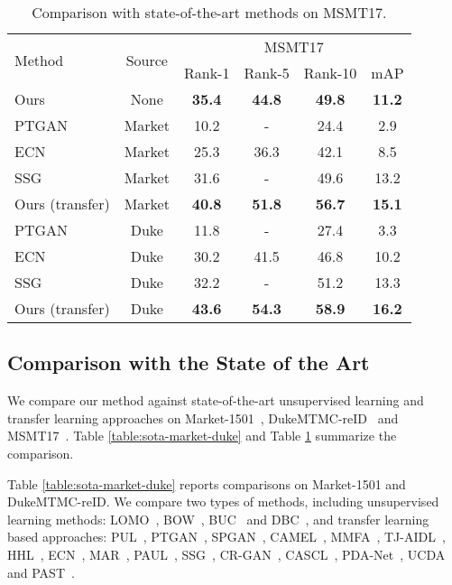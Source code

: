 \documentclass[10pt,twocolumn,letterpaper]{article}
\begin{document}
\begin{table}
\footnotesize
\begin{center}
\begin{tabular}{l|c|c|c|c|c}
\hline
\multirow{2}{*}{Method} & \multirow{2}{*}{Source} & \multicolumn{4}{c}{MSMT17} \\
\cline{3-6}
& &Rank-1 & Rank-5 & Rank-10 & mAP  \\
\hline\hline
Ours & None & \textbf{35.4} & \textbf{44.8} & \textbf{49.8}& \textbf{11.2} \\
\hline\hline
PTGAN~\cite{wei2018person} & Market &10.2 & - & 24.4 & 2.9 \\
ECN~\cite{zhong2019invariance} & Market &  25.3 & 36.3 & 42.1 & 8.5 \\
SSG~\cite{Fu_2019_ICCV} & Market & 31.6 & - & 49.6 & 13.2\\
Ours (transfer) & Market & \textbf{40.8} & \textbf{51.8} & \textbf{56.7} & \textbf{15.1} \\
\hline
PTGAN~\cite{wei2018person} & Duke &11.8 & - & 27.4 & 3.3 \\
ECN~\cite{zhong2019invariance} & Duke & 30.2 & 41.5 & 46.8 & 10.2 \\
SSG~\cite{Fu_2019_ICCV} & Duke & 32.2 & - & 51.2 & 13.3\\
Ours (transfer) & Duke & \textbf{43.6} & \textbf{54.3} & \textbf{58.9} & \textbf{16.2}\\
\hline
\end{tabular}
\end{center}
\vspace{-2mm}
\caption{Comparison with state-of-the-art methods on MSMT17.}
\vspace{-2mm}
\label{table:sota-msmt17}
\end{table}

\vspace{-1mm}
\subsection{Comparison with the State of the Art}
We compare our method against state-of-the-art unsupervised learning and transfer learning approaches on Market-1501~\cite{zheng2015scalable}, DukeMTMC-reID~\cite{ristani2016performance} and MSMT17~\cite{wei2018person}. Table \ref{table:sota-market-duke} and Table \ref{table:sota-msmt17} summarize the comparison.

Table \ref{table:sota-market-duke} reports comparisons on Market-1501 and DukeMTMC-reID. We compare two types of methods, including unsupervised learning methods: LOMO~\cite{liao2015person}, BOW~\cite{zheng2015scalable},  BUC~\cite{lin2019bottom} and DBC~\cite{ding12dispersion}, and transfer learning based approaches: PUL~\cite{fan2018unsupervised}, PTGAN~\cite{wei2018person}, SPGAN~\cite{deng2018image}, CAMEL~\cite{yu2017cross}, MMFA~\cite{lin2018multi}, TJ-AIDL~\cite{wang2018transferable}, HHL~\cite{zhong2018generalizing}, ECN~\cite{zhong2019invariance}, MAR~\cite{yu2019unsupervised}, PAUL~\cite{Yang_2019_CVPR}, SSG~\cite{Fu_2019_ICCV}, CR-GAN~\cite{Chen_2019_ICCV}, CASCL~\cite{Wu_2019_ICCV}, PDA-Net~\cite{ Li_2019_ICCV}, UCDA~\cite{Qi_2019_ICCV} and PAST~\cite{Zhang_2019_ICCV}.
\end{document}
